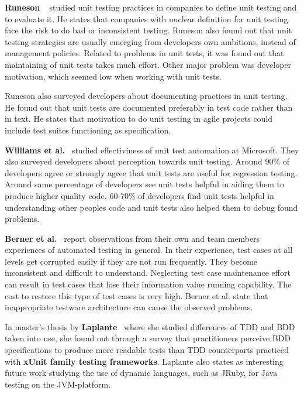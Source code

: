     \textbf{Runeson} ~\cite{runeson2006survey} studied unit testing practices in companies to define unit testing and to evaluate it.
    He states that companies with unclear definition for unit testing face the risk to do bad or inconsistent
    testing. Runeson also found out that unit testing strategies are usually emerging from developers own ambitions, instead of
    management policies.
    Related to problems in unit tests, it was found out that maintaining of unit tests takes much effort. Other
    major problem was developer motivation, which seemed low when working with unit tests.

    Runeson also surveyed developers about documenting practices in unit testing. He found out that unit tests
    are documented preferably in test code rather than in text. He states that motivation to do unit testing in agile projects
    could include test suites functioning as specification.

    \textbf{Williams et al.}~\cite{williams2009effectiveness} studied effectiviness of unit test automation at Microsoft. They also
    surveyed developers about perception towards unit testing.  Around 90\% of developers agree or strongly agree that unit
    tests are useful for regression testing. Around same percentage of developers see unit tests helpful in aiding them to
    produce higher quality code. 60-70\% of developers find unit tests helpful in understanding other peoples code and
    unit tests also helped them to debug found problems.

    \textbf{Berner et al.}~\cite{berner2005observations} report observations from their own and team members experiences of
    automated testing in general. In their experience, test cases at all levels get corrupted easily if they are not
    run frequently. They become inconsistent and difficult to understand. Neglecting test case maintenance effort can result
    in test cases that lose their information value running capability. The cost to restore this type of test cases is very high.
    Berner et al. state that inappropriate testware architecture can cause the observed problems.

    In master's thesis by \textbf{Laplante}~\cite{laplante2009behavior} where she studied differences of TDD and BDD taken into use,
    she found out through a survey that practitioners perceive BDD
    specifications to produce more readable tests than TDD counterparts practiced with \textbf{xUnit family testing frameworks}. Laplante
    also states as interesting future work studying the use of dynamic languages, such as JRuby, for Java testing on the JVM-platform.

